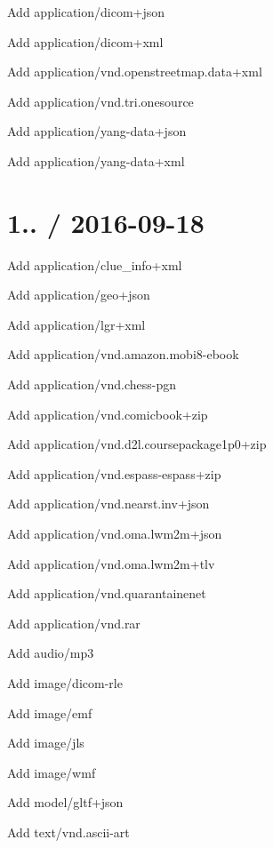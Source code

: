
\begin{DoxyItemize}
\item Add {\ttfamily application/dicom+json}
\item Add {\ttfamily application/dicom+xml}
\item Add {\ttfamily application/vnd.\+openstreetmap.\+data+xml}
\item Add {\ttfamily application/vnd.\+tri.\+onesource}
\item Add {\ttfamily application/yang-\/data+json}
\item Add {\ttfamily application/yang-\/data+xml}
\end{DoxyItemize}

\section*{1.. / 2016-\/09-\/18 }


\begin{DoxyItemize}
\item Add {\ttfamily application/clue\+\_\+info+xml}
\item Add {\ttfamily application/geo+json}
\item Add {\ttfamily application/lgr+xml}
\item Add {\ttfamily application/vnd.\+amazon.\+mobi8-\/ebook}
\item Add {\ttfamily application/vnd.\+chess-\/pgn}
\item Add {\ttfamily application/vnd.\+comicbook+zip}
\item Add {\ttfamily application/vnd.\+d2l.\+coursepackage1p0+zip}
\item Add {\ttfamily application/vnd.\+espass-\/espass+zip}
\item Add {\ttfamily application/vnd.\+nearst.\+inv+json}
\item Add {\ttfamily application/vnd.\+oma.\+lwm2m+json}
\item Add {\ttfamily application/vnd.\+oma.\+lwm2m+tlv}
\item Add {\ttfamily application/vnd.\+quarantainenet}
\item Add {\ttfamily application/vnd.\+rar}
\item Add {\ttfamily audio/mp3}
\item Add {\ttfamily image/dicom-\/rle}
\item Add {\ttfamily image/emf}
\item Add {\ttfamily image/jls}
\item Add {\ttfamily image/wmf}
\item Add {\ttfamily model/gltf+json}
\item Add {\ttfamily text/vnd.\+ascii-\/art}
\end{DoxyItemize}

